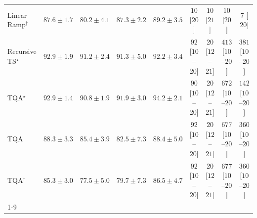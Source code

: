 \begin{tabular}{l|cccc|cccc|}
Linear Ramp$^\dagger$ & {\cellcolor[HTML]{0566A0}} \color[HTML]{F1F1F1} $87.6\pm 1.7$ & {\cellcolor[HTML]{2F8BBE}} \color[HTML]{F1F1F1} $80.2\pm 4.1$ & {\cellcolor[HTML]{0567A2}} \color[HTML]{F1F1F1} $87.3\pm 2.2$ & {\cellcolor[HTML]{046096}} \color[HTML]{F1F1F1} $89.2\pm 3.5$ & {\cellcolor[HTML]{FFF7F3}} \color[HTML]{000000} $10$ [$20$] & {\cellcolor[HTML]{FFF7F3}} \color[HTML]{000000} $10$ [$21$] & {\cellcolor[HTML]{FFF7F3}} \color[HTML]{000000} $10$ [$20$] & {\cellcolor[HTML]{FFF7F3}} \color[HTML]{000000} $7$ [$20$] \\
Recursive TS$^\star$ & {\cellcolor[HTML]{034D79}} \color[HTML]{F1F1F1} $92.9\pm 1.9$ & {\cellcolor[HTML]{045788}} \color[HTML]{F1F1F1} $91.2\pm 2.4$ & {\cellcolor[HTML]{045788}} \color[HTML]{F1F1F1} $91.3\pm 5.0$ & {\cellcolor[HTML]{045280}} \color[HTML]{F1F1F1} $92.2\pm 3.4$ & {\cellcolor[HTML]{FDE3E0}} \color[HTML]{000000} $92$ [$10$--$20$] & {\cellcolor[HTML]{FFF4F0}} \color[HTML]{000000} $20$ [$12$--$21$] & {\cellcolor[HTML]{F25D9F}} \color[HTML]{F1F1F1} $413$ [$10$--$20$] & {\cellcolor[HTML]{F770A4}} \color[HTML]{F1F1F1} $381$ [$10$--$20$] \\
TQA$^\star$ & {\cellcolor[HTML]{034D79}} \color[HTML]{F1F1F1} $92.9\pm 1.4$ & {\cellcolor[HTML]{045A8D}} \color[HTML]{F1F1F1} $90.8\pm 1.9$ & {\cellcolor[HTML]{045382}} \color[HTML]{F1F1F1} $91.9\pm 3.0$ & {\cellcolor[HTML]{03456C}} \color[HTML]{F1F1F1} $94.2\pm 2.1$ & {\cellcolor[HTML]{FDE4E0}} \color[HTML]{000000} $90$ [$10$--$20$] & {\cellcolor[HTML]{FFF4F0}} \color[HTML]{000000} $20$ [$12$--$21$] & {\cellcolor[HTML]{810178}} \color[HTML]{F1F1F1} $672$ [$10$--$20$] & {\cellcolor[HTML]{FDD6D2}} \color[HTML]{000000} $142$ [$10$--$20$] \\
TQA & {\cellcolor[HTML]{04649D}} \color[HTML]{F1F1F1} $88.3\pm 3.3$ & {\cellcolor[HTML]{056FAE}} \color[HTML]{F1F1F1} $85.4\pm 3.9$ & {\cellcolor[HTML]{1B7EB7}} \color[HTML]{F1F1F1} $82.5\pm 7.3$ & {\cellcolor[HTML]{04639B}} \color[HTML]{F1F1F1} $88.4\pm 5.0$ & {\cellcolor[HTML]{FDE3E0}} \color[HTML]{000000} $92$ [$10$--$20$] & {\cellcolor[HTML]{FFF4F0}} \color[HTML]{000000} $20$ [$12$--$21$] & {\cellcolor[HTML]{7D0177}} \color[HTML]{F1F1F1} $677$ [$10$--$20$] & {\cellcolor[HTML]{F87CA8}} \color[HTML]{F1F1F1} $360$ [$10$--$20$] \\
TQA$^\dagger$ & {\cellcolor[HTML]{056FAE}} \color[HTML]{F1F1F1} $85.3\pm 3.0$ & {\cellcolor[HTML]{4A98C5}} \color[HTML]{F1F1F1} $77.5\pm 5.0$ & {\cellcolor[HTML]{348EBF}} \color[HTML]{F1F1F1} $79.7\pm 7.3$ & {\cellcolor[HTML]{056BA7}} \color[HTML]{F1F1F1} $86.5\pm 4.7$ & {\cellcolor[HTML]{FDE3E0}} \color[HTML]{000000} $92$ [$10$--$20$] & {\cellcolor[HTML]{FFF4F0}} \color[HTML]{000000} $20$ [$12$--$21$] & {\cellcolor[HTML]{7D0177}} \color[HTML]{F1F1F1} $677$ [$10$--$20$] & {\cellcolor[HTML]{F87CA8}} \color[HTML]{F1F1F1} $360$ [$10$--$20$] \\
\cline{1-9}
\bottomrule
\end{tabular}
